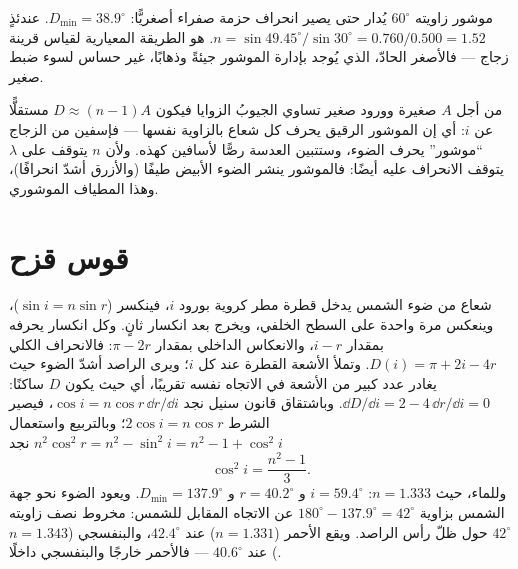 \begin{example}\label{ex:b1:rays-reflection-refraction:prismnum}
موشور زاويته $60^\circ$ يُدار حتى يصير انحراف حزمة صفراء أصغريًّا:
$D_{\min} = 38.9^\circ$. عندئذٍ $n = \sin 49.45^\circ/\sin 30^\circ
= 0.760/0.500 = 1.52$.  هو الطريقة المعيارية لقياس
قرينة زجاج --- فالأصغر الحادّ، الذي يُوجد بإدارة الموشور جيئةً
وذهابًا، غير حساس لسوء ضبط صغير.
\end{example}

\begin{remark}\label{rem:b1:rays-reflection-refraction:thin}
من أجل $A$ صغيرة وورود صغير تساوي الجيوبُ الزوايا فيكون
$D \approx (n - 1)A$ مستقلًّا عن $i$: أي إن الموشور الرقيق يحرف كل
شعاع بالزاوية نفسها --- فإسفين من الزجاج ``موشور'' يحرف الضوء، وستتبين
العدسة رصًّا لأسافين كهذه. ولأن $n$ يتوقف على $\lambda$ يتوقف الانحراف
عليه أيضًا: فالموشور ينشر الضوء الأبيض طيفًا (والأزرق أشدّ انحرافًا)،
وهذا  المطياف الموشوري.
\end{remark}

\section{قوس قزح}

\begin{example}\label{ex:b1:rays-reflection-refraction:rainbow}
شعاع من ضوء الشمس يدخل قطرة مطر كروية بورود $i$، فينكسر
($\sin i = n\sin r$)، وينعكس مرة واحدة على السطح الخلفي، ويخرج بعد
انكسار ثانٍ. وكل انكسار يحرفه بمقدار $i - r$، والانعكاس الداخلي
بمقدار $\pi - 2r$: فالانحراف الكلي $D(i) = \pi + 2i - 4r$. وتملأ
الأشعة القطرة عند كل $i$؛ ويرى الراصد أشدّ الضوء حيث يغادر عدد كبير
من الأشعة في الاتجاه نفسه تقريبًا، أي حيث يكون $D$ ساكنًا:
$\dd D/\dd i = 2 - 4\,\dd r/\dd i
= 0$. وباشتقاق قانون سنيل نجد
$\cos i = n\cos r\,\dd r/\dd i$، فيصير الشرط $2\cos i = n\cos r$؛
وبالتربيع واستعمال
$n^2\cos^2 r = n^2 - \sin^2 i = n^2 - 1 + \cos^2 i$ نجد
\[
\cos^2 i = \frac{n^2 - 1}{3} .
\]
وللماء، حيث $n = 1.333$: $i = 59.4^\circ$ و $r = 40.2^\circ$ و
$D_{\min} = 137.9^\circ$. ويعود الضوء نحو جهة الشمس
بزاوية $180^\circ - 137.9^\circ = 42^\circ$ عن الاتجاه المقابل للشمس:
 مخروط نصف زاويته $42^\circ$ حول ظلّ رأس
الراصد. ويقع الأحمر ($n = 1.331$) عند $42.4^\circ$، والبنفسجي
($n = 1.343$) عند $40.6^\circ$ --- فالأحمر خارجًا والبنفسجي داخلًا.
\end{example}

